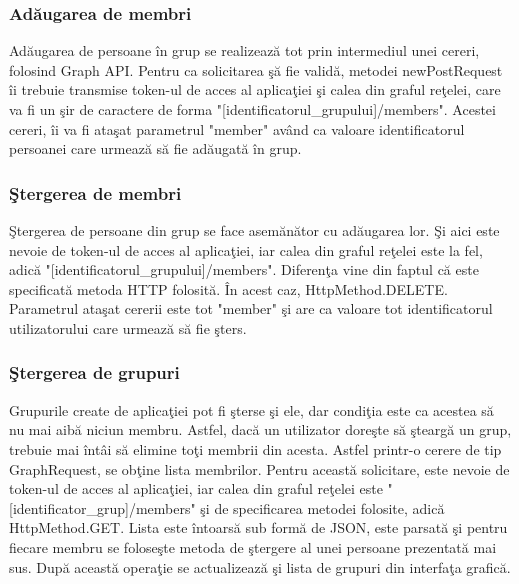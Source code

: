 \subsubsection{Ad\u{a}ugarea de membri}

Ad\u{a}ugarea de persoane \^{i}n grup se realizeaz\u{a} tot prin intermediul unei cereri, folosind Graph API. Pentru ca solicitarea \c{s}\u{a} fie valid\u{a}, metodei newPostRequest \^{i}i trebuie transmise token-ul de acces al aplica\c{t}iei \c{s}i calea din graful re\c{t}elei, care va fi un \c{s}ir de caractere de forma "[identificatorul_grupului]/members". Acestei  cereri, \^{i}i va fi ata\c{s}at parametrul "member" av\^{a}nd ca valoare identificatorul persoanei care urmeaz\u{a} s\u{a} fie ad\u{a}ugat\u{a} \^{i}n grup.

\subsubsection{\c{S}tergerea de membri}

\c{S}tergerea de persoane din grup se face asem\u{a}n\u{a}tor cu ad\u{a}ugarea lor. \c{S}i aici este nevoie de token-ul de acces al aplica\c{t}iei, iar calea din graful re\c{t}elei este la fel, adic\u{a} "[identificatorul_grupului]/members". Diferen\c{t}a vine din faptul c\u{a} este specificat\u{a} metoda HTTP folosit\u{a}. \^{I}n acest caz, HttpMethod.DELETE. Parametrul ata\c{s}at cererii este tot "member" \c{s}i are ca valoare tot identificatorul utilizatorului care urmeaz\u{a} s\u{a} fie \c{s}ters.

\subsubsection{\c{S}tergerea de grupuri}

Grupurile create de aplica\c{t}iei pot fi \c{s}terse \c{s}i ele, dar condi\c{t}ia este ca acestea s\u{a} nu mai aib\u{a} niciun membru. Astfel, dac\u{a} un utilizator dore\c{s}te s\u{a} \c{s}tearg\u{a} un grup, trebuie mai \^{i}nt\^{a}i s\u{a} elimine to\c{t}i membrii din acesta. Astfel printr-o cerere de tip GraphRequest, se ob\c{t}ine lista membrilor. Pentru aceast\u{a} solicitare, este nevoie de token-ul de acces al aplica\c{t}iei, iar calea din graful re\c{t}elei este "[identificator_grup]/members" \c{s}i de specificarea metodei folosite, adic\u{a} HttpMethod.GET. Lista este \^{i}ntoars\u{a} sub form\u{a} de JSON, este parsat\u{a} \c{s}i pentru fiecare membru se folose\c{s}te metoda de \c{s}tergere al unei persoane prezentat\u{a} mai sus. Dup\u{a} aceast\u{a} opera\c{t}ie se actualizeaz\u{a} \c{s}i lista de grupuri din interfa\c{t}a grafic\u{a}.

